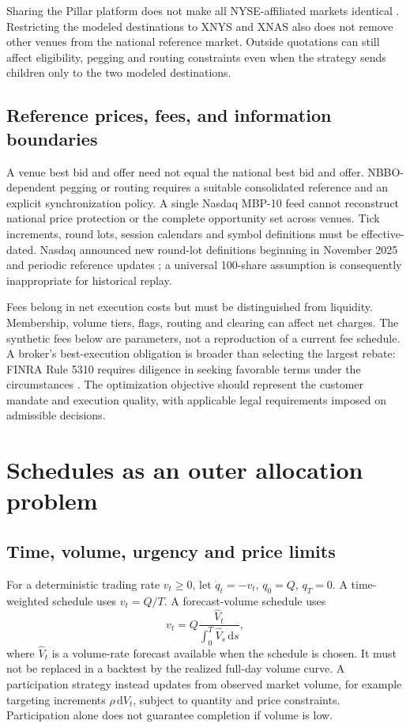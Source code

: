 \documentclass[11pt]{article}
\numberwithin{equation}{section}
\theoremstyle{definition}
\theoremstyle{remark}
\theoremstyle{definition}
\newcommand{\dd}{\,\mathrm d}
\begin{document}
Sharing the Pillar platform does not make all NYSE-affiliated markets identical
\citep{nysepillar}. Restricting the modeled destinations to XNYS and XNAS also
does not remove other venues from the national reference market. Outside
quotations can still affect eligibility, pegging and routing constraints even
when the strategy sends children only to the two modeled destinations.

\subsection{Reference prices, fees, and information boundaries}

A venue best bid and offer need not equal the national best bid and offer.
NBBO-dependent pegging or routing requires a suitable consolidated reference
and an explicit synchronization policy. A single Nasdaq MBP-10 feed cannot
reconstruct national price protection or the complete opportunity set across
venues. Tick increments, round lots, session calendars and symbol definitions
must be effective-dated. Nasdaq announced new round-lot definitions beginning
in November 2025 and periodic reference updates \citep{nasdaqlots}; a universal
100-share assumption is consequently inappropriate for historical replay.

Fees belong in net execution costs but must be distinguished from liquidity.
Membership, volume tiers, flags, routing and clearing can affect net charges.
The synthetic fees below are parameters, not a reproduction of a current fee
schedule. A broker's best-execution obligation is broader than selecting the
largest rebate: FINRA Rule 5310 requires diligence in seeking favorable terms
under the circumstances \citep{finra5310}. The optimization objective should
represent the customer mandate and execution quality, with applicable legal
requirements imposed on admissible decisions.

\section{Schedules as an outer allocation problem}\label{sec:schedule}

\subsection{Time, volume, urgency and price limits}

For a deterministic trading rate $v_t\geq0$, let
$\dot q_t=-v_t$, $q_0=Q$, $q_T=0$. A time-weighted schedule uses
$v_t=Q/T$. A forecast-volume schedule uses
\begin{equation}\label{eq:vwap}
 v_t=Q\frac{\widehat V_t}{\int_0^T\widehat V_s\dd s},
\end{equation}
where $\widehat V_t$ is a volume-rate forecast available when the schedule is
chosen. It must not be replaced in a backtest by the realized full-day volume
curve. A participation strategy instead updates from observed market volume,
for example targeting increments $\rho\dd V_t$, subject to quantity and price
constraints. Participation alone does not guarantee completion if volume is low.
\end{document}
